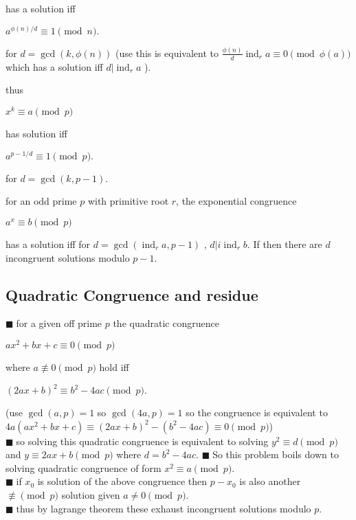 \documentclass[11pt]{extarticle}
\newcommand{\snote}[1]{{\footnotesize(#1)}}
\newcommand{\tbx}[2][]{
\begin{tcolorbox}[enhanced,breakable,size=small,colback=black!2!white,title={#1},arc is angular, arc=1.5mm,
	drop fuzzy shadow]
	#2
\end{tcolorbox}
}
\newcommand{\y}{$\blacksquare\;$}
\DeclareMathOperator{\ix}{ind}
\begin{document}
\begin{multicols}{2}
{{	has a solution iff 
\begin{center}
 $ a^{\phi(n)/d}\equiv 1\pmod{n}. $ 
 \end{center}
} for $ d=\gcd(k,\phi(n)) $ \snote{use this is equivalent to $ \frac{ \phi(n) }{d} \ix_ra\equiv 0\pmod{\phi(a)} $ which has a solution iff $ d|\ix_ra $ }.
\tbx{ thus 
\begin{center}
 $ x^k\equiv a\pmod{p} $ 
 \end{center}
 
	has solution iff 
\begin{center}
 $ a^{p-1/d} \equiv 1\pmod{p}. $ 
 \end{center}
 for $ d=\gcd(k,p-1) .$ }}
\tbx[Exponential Congruence]{  for an odd prime $ p $ with primitive root $ r $, the exponential congruence 
\begin{center}
 $  a^x\equiv b\pmod{p} $ 
 \end{center}
 has a solution iff for $ d=\gcd(\ix_ra,p-1) $ , $ d|i\ix_rb. $ If then there are $ d $ incongruent solutions modulo $ p-1. $}

\subsection{Quadratic Congruence and residue}
 
\tbx[main problem]{ 
\y for a given off prime $ p $ the quadratic congruence 

\begin{center}
 $ ax^2+bx+c\equiv 0\pmod{p} $ 
 \end{center}
 where $ a\not\equiv 0\pmod{p} $ 
hold iff 
\begin{center}
 $ (2ax+b)^2\equiv b^2-4ac\pmod p. $ 
 \end{center}

\snote{use $ \gcd(a,p)=1 $ so $ \gcd(4a,p)=1 $ so the congruence is equivalent to $ 4a(ax^2+bx+c)\equiv(2ax+b)^2-(b^2-4ac)\equiv 0\pmod{p} $} \\
\y so solving this quadratic congruence is equivalent to solving  
$ y^2\equiv d\pmod{p}$ and $
y\equiv2ax+b\pmod{p} $
where $ d=b^2-4ac. $
\y So this problem boils down to solving quadratic congruence of form $ x^2\equiv a\pmod{p}. $\\
\y if $ x_0 $ is solution of the above congruence then $ p-x_0 $  is also another $ \not\equiv\pmod{p} $  solution given $ a\neq 0\pmod{p}.$\\
\y thus by lagrange theorem these exhaust incongruent solutions modulo $ p. $}


\end{multicols}
\end{document}
